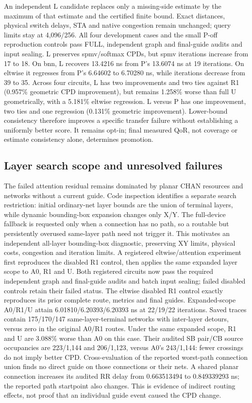 \documentclass[conference,10pt]{IEEEtran}
\begin{document}
An independent L candidate replaces only a missing-side estimate by the maximum of that estimate and the certified finite bound. Exact distances, physical switch delays, STA and native congestion remain unchanged; query limits stay at 4,096/256. All four development cases and the small P-off reproduction controls pass FULL, independent graph and final-guide audits and input sealing. L preserves spmv/softmax CPDs, but spmv iterations increase from 17 to 18. On bnn, L recovers 13.4216 ns from P's 13.6074 ns at 19 iterations. On eltwise it regresses from P's 6.64602 to 6.70280 ns, while iterations decrease from 39 to 35. Across four circuits, L has two improvements and two ties against R1 (0.957\% geometric CPD improvement), but remains 1.258\% worse than full U geometrically, with a 5.181\% eltwise regression. L versus P has one improvement, two ties and one regression (0.131\% geometric improvement). Lower-bound consistency therefore improves a specific transfer failure without establishing a uniformly better score. It remains opt-in; final measured QoR, not coverage or estimate consistency alone, determines promotion.

\subsection{Layer search scope and unresolved failures}
The failed attention residual remains dominated by planar CHAN resources and networks without a current guide. Code inspection identifies a separate search restriction: initial ordinary-net layer bounds are the union of terminal layers, while dynamic bounding-box expansion changes only X/Y. The full-device fallback is requested only when a connection has no path, so a routable but persistently overused same-layer path need not trigger it. This motivates an independent all-layer bounding-box diagnostic, preserving XY limits, physical costs, congestion and iteration limits. A registered eltwise/attention experiment first reproduces the disabled R1 control, then applies the same expanded layer scope to A0, R1 and U. Both registered circuits now pass the required independent graph and final-guide audits and batch input sealing; failed disabled controls retain their failed status. The eltwise disabled R1 control exactly reproduces its prior complete route, metrics and final guides. Expanded-scope A0/R1/U attain 6.01810/6.20393/6.20393 ns at 22/19/22 iterations. Saved traces contain 175/170/147 same-layer-terminal networks with inter-layer detours, versus zero in the original A0/R1 routes. Under the same expanded scope, R1 and U are 3.088\% worse than A0 on this case. Their audited SB pair/CB source occupancies are 223/1,144 and 206/1,123, versus A0's 243/1,144: fewer crossings do not imply better CPD. Cross-evaluation of the reported worst-path connection union finds no direct guide on those connections or their nets. A shared planar connection increases its audited RR delay from 0.663513494 to 0.849339293 ns; the reported path startpoint also changes. This is evidence of indirect routing effects, not proof that an individual guide event caused the CPD change.
\end{document}
